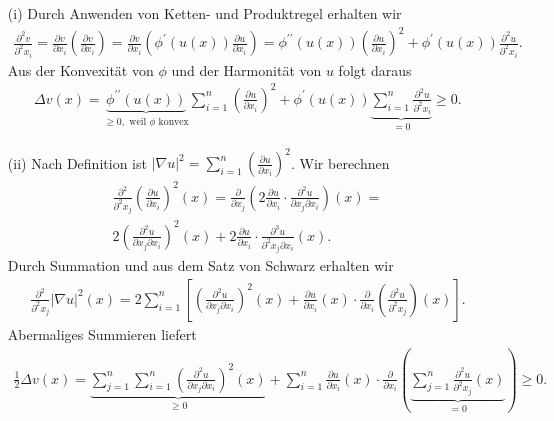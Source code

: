 \begin{solution}
\phantom{}
  \begin{itemize}

  \item[(i)] Durch Anwenden von Ketten- und Produktregel erhalten wir
  \begin{align*}
      \frac{\partial^2 v}{\partial^2 x_i} = \frac{\partial v}{\partial x_i} \left(\frac{\partial v}{\partial x_i}\right) = \frac{\partial v}{\partial x_i} \left(\phi^\prime(u(x)) \frac{\partial u}{\partial x_i}\right) = \phi^{\prime\prime}(u(x)) \left(\frac{\partial u}{\partial x_i}\right)^2 + \phi^\prime(u(x)) \frac{\partial^2 u}{\partial^2 x_i}.
  \end{align*}
  Aus der Konvexität von $\phi$ und der Harmonität von $u$ folgt daraus
  \begin{align*}
      \Delta v(x) = \underbrace{\phi^{\prime\prime}(u(x))}_{\geq 0, \text{~weil $\phi$ konvex}} \sum_{i=1}^n \left(\frac{\partial u}{\partial x_i}\right)^2 + \phi^\prime(u(x)) \underbrace{\sum_{i=1}^n \frac{\partial^2 u}{\partial^2 x_i}}_{= 0} \geq 0.
  \end{align*}
  \item[(ii)] Nach Definition ist $|\nabla u|^2 = \sum_{i=1}^n \left(\frac{\partial u}{\partial x_i}\right)^2$. Wir berechnen
\begin{align*}
    \frac{\partial^2}{\partial^2 x_j} \left(\frac{\partial u}{\partial x_i}\right)^2 (x) = \frac{\partial}{\partial x_j} \left(2 \frac{\partial u}{\partial x_i} \cdot \frac{\partial^2 u}{\partial x_j \partial x_i} \right)(x) = \\
    2 \left(\frac{\partial^2 u}{\partial x_j \partial x_i}\right)^2 (x) + 2\frac{\partial u}{\partial x_i} \cdot \frac{\partial^3 u}{\partial^2 x_j \partial x_i} (x).
\end{align*}
Durch Summation und aus dem Satz von Schwarz erhalten wir
\begin{align*}
    \frac{\partial^2}{\partial^2 x_j} |\nabla u|^2 (x) = 2 \sum_{i=1}^n \left[ \left(\frac{\partial^2 u}{\partial x_j \partial x_i} \right)^2(x) + \frac{\partial u}{\partial x_i}(x) \cdot \frac{\partial}{\partial x_i} \left(\frac{\partial^2 u}{\partial^2 x_j}\right)(x) \right].
\end{align*}
Abermaliges Summieren liefert
\begin{align*}
    \frac{1}{2} \Delta v (x) = \underbrace{\sum_{j=1}^n \sum_{i=1}^n \left(\frac{\partial^2 u}{\partial x_j \partial x_i} \right)^2(x)}_{\geq 0} +
    \sum_{i=1}^n \frac{\partial u}{\partial x_i}(x) \cdot \frac{\partial}{\partial x_i} \left( \underbrace{\sum_{j=1}^n \frac{\partial^2 u}{\partial^2 x_j}(x)}_{= 0} \right) \geq 0.
\end{align*}
  \end{itemize}

\end{solution}

